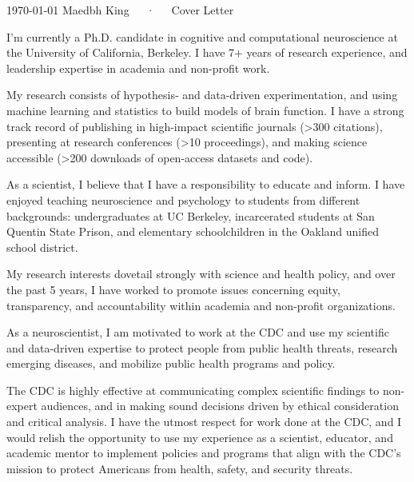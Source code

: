 \documentclass[11pt, a4paper]{maedbh-cv}
\begin{document}
\makecvheader[R]

\makecvfooter
  {\today}
  {Maedbh King~~~·~~~Cover Letter}
  {}

\makelettertitle

\begin{cvletter}

I'm currently a Ph.D. candidate in cognitive and computational neuroscience at the University of California, Berkeley. I have 7+ years of research experience, and leadership expertise in academia and non-profit work. 

	My research consists of hypothesis‐ and data-driven experimentation, and using machine learning and statistics to build models of brain function. I have a strong track record of publishing in high-impact scientific journals (>300 citations), presenting at research conferences (>10 proceedings), and making science accessible (>200 downloads of open-access datasets and code). 

	As a scientist, I believe that I have a responsibility to educate and inform. I have enjoyed teaching neuroscience and psychology to students from different backgrounds: undergraduates at UC Berkeley, incarcerated students at San Quentin State Prison, and elementary schoolchildren in the Oakland unified school district. 
	
	My research interests dovetail strongly with science and health policy, and over the past 5 years, I have worked to promote issues concerning equity, transparency, and accountability within academia and non-profit organizations.  


As a neuroscientist, I am motivated to work at the CDC and use my scientific and data-driven expertise to protect people from public health threats, research emerging diseases, and mobilize public health programs and policy.  

The CDC is highly effective at communicating complex scientific findings to non-expert audiences, and in making sound decisions driven by ethical consideration and critical analysis.
I have the utmost respect for work done at the CDC, and I would relish the opportunity to use my experience as a scientist, educator, and academic mentor to implement policies and programs that align with the CDC's mission to protect Americans from health, safety, and security threats.  


\end{cvletter}
\end{document}
